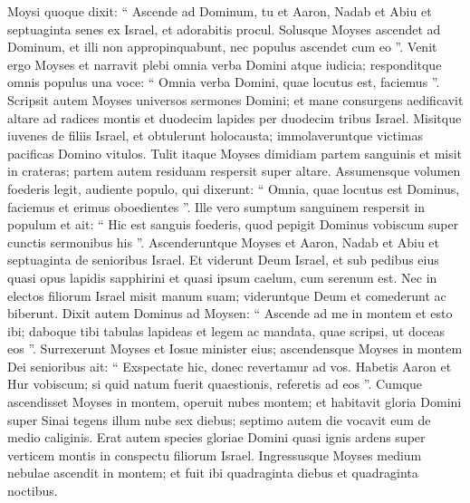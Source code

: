 \begin{biblechapter}
\begin{biblechapter}
\begin{biblechapter}
\begin{biblechapter}
\begin{biblechapter}
\begin{biblechapter}
\begin{biblechapter}
\begin{biblechapter}
\begin{biblechapter}
\begin{biblechapter}
\begin{biblechapter}
\begin{biblechapter}
\begin{biblechapter}
\begin{biblechapter}
\begin{biblechapter}
\begin{biblechapter}
\begin{biblechapter}
\begin{biblechapter}
\begin{biblechapter}
\begin{biblechapter}
\begin{biblechapter}
\begin{biblechapter}
\begin{biblechapter}
\begin{biblechapter}
\verse Moysi quoque dixit: “ Ascende ad Dominum, tu et Aaron, Nadab et Abiu et septuaginta senes ex Israel, et adorabitis procul. 
\verse Solusque Moyses ascendet ad Dominum, et illi non appropinquabunt, nec populus ascendet cum eo ”.
 \verse Venit ergo Moyses et narravit plebi omnia verba Domini atque iudicia; responditque omnis populus una voce: “ Omnia verba Domini, quae locutus est, faciemus ”. 
\verse Scripsit autem Moyses universos sermones Domini; et mane consurgens aedificavit altare ad radices montis et duodecim lapides per duodecim tribus Israel. 
\verse Misitque iuvenes de filiis Israel, et obtulerunt holocausta; immolaveruntque victimas pacificas Domino vitulos. 
\verse Tulit itaque Moyses dimidiam partem sanguinis et misit in crateras; partem autem residuam respersit super altare. 
\verse Assumensque volumen foederis legit, audiente populo, qui dixerunt: “ Omnia, quae locutus est Dominus, faciemus et erimus oboedientes ”. 
\verse Ille vero sumptum sanguinem respersit in populum et ait: “ Hic est sanguis foederis, quod pepigit Dominus vobiscum super cunctis sermonibus his ”.
 \verse Ascenderuntque Moyses et Aaron, Nadab et Abiu et septuaginta de senioribus Israel. 
\verse Et viderunt Deum Israel, et sub pedibus eius quasi opus lapidis sapphirini et quasi ipsum caelum, cum serenum est. 
\verse Nec in electos filiorum Israel misit manum suam; videruntque Deum et comederunt ac biberunt.
 \verse Dixit autem Dominus ad Moysen: “ Ascende ad me in montem et esto ibi; daboque tibi tabulas lapideas et legem ac mandata, quae scripsi, ut doceas eos ”. 
\verse Surrexerunt Moyses et Iosue minister eius; ascendensque Moyses in montem Dei 
 \verse senioribus ait: “ Exspectate hic, donec revertamur ad vos. Habetis Aaron et Hur vobiscum; si quid natum fuerit quaestionis, referetis ad eos ”.
 \verse Cumque ascendisset Moyses in montem, operuit nubes montem; 
\verse et habitavit gloria Domini super Sinai tegens illum nube sex diebus; septimo autem die vocavit eum de medio caliginis. 
\verse Erat autem species gloriae Domini quasi ignis ardens super verticem montis in conspectu filiorum Israel. 
\verse Ingressusque Moyses medium nebulae ascendit in montem; et fuit ibi quadraginta diebus et quadraginta noctibus.
 

\end{biblechapter}
\end{biblechapter}
\end{biblechapter}
\end{biblechapter}
\end{biblechapter}
\end{biblechapter}
\end{biblechapter}
\end{biblechapter}
\end{biblechapter}
\end{biblechapter}
\end{biblechapter}
\end{biblechapter}
\end{biblechapter}
\end{biblechapter}
\end{biblechapter}
\end{biblechapter}
\end{biblechapter}
\end{biblechapter}
\end{biblechapter}
\end{biblechapter}
\end{biblechapter}
\end{biblechapter}
\end{biblechapter}
\end{biblechapter}
